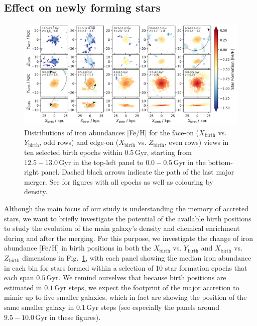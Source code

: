 \documentclass[fleqn,usenatbib]{mnras}
\begin{document}
\subsection{Effect on newly forming stars}

\begin{figure}
    \centering
    \includegraphics[width=\textwidth]{figures/trace_star_formation_xy_xz_feh_selection.png}
    \caption{Distributions of iron abundances {[Fe/H]} for the face-on ($X_\mathrm{birth}$ vs. $Y_\mathrm{birth}$, odd rows) and edge-on ($X_\mathrm{birth}$ vs. $Z_\mathrm{birth}$, even rows) views in ten selected birth epochs within $0.5\,\mathrm{Gyr}$, starting from $12.5-13.0\,\mathrm{Gyr}$ in the top-left panel to $0.0-0.5\,\mathrm{Gyr}$ in the bottom-right panel. Dashed black arrows indicate the path of the last major merger. See \href{https://github.com/svenbuder/golden_thread_II/tree/main/figures}{\faGithub} for figures with all epochs as well as colouring by density.}
    \label{fig:trace_star_formation_xy_xz_feh_selection}
\end{figure}

Although the main focus of our study is understanding the memory of accreted stars, we want to briefly investigate the potential of the available birth positions to study the evolution of the main galaxy's density and chemical enrichment during and after the merging. For this purpose, we investigate the change of iron abundance [Fe/H] in birth positions in both the $X_\mathrm{birth}$ vs. $Y_\mathrm{birth}$ and $X_\mathrm{birth}$ vs. $Z_\mathrm{birth}$ dimensions in Fig.~\ref{fig:trace_star_formation_xy_xz_feh_selection}, with each panel showing the median iron abundance in each bin for stars formed within a selection of 10 star formation epochs that each span $0.5\,\mathrm{Gyr}$. We remind ourselves that because birth positions are estimated in $0.1\,\mathrm{Gyr}$ steps, we expect the footprint of the major accretion to mimic up to five smaller galaxies, which in fact are showing the position of the same smaller galaxy in $0.1\,\mathrm{Gyr}$ steps (see especially the panels around $9.5-10.0\,\mathrm{Gyr}$ in these figures).
\end{document}
